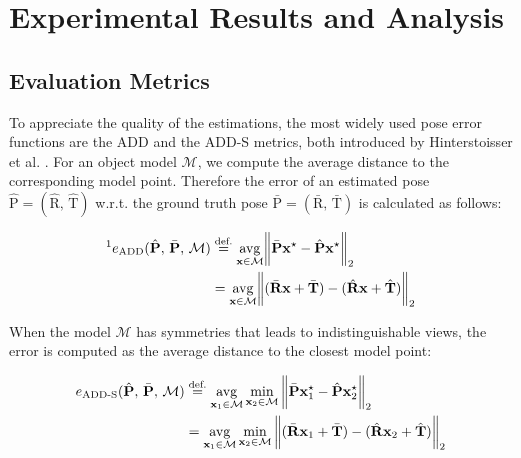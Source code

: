 
\chapter{Experimental Results and Analysis}\label{chapter:presentation_of_the_results}

\section{Evaluation Metrics}

To appreciate the quality of the estimations, the most widely used pose error functions are the \ac{ADD} and the \ac{ADD-S} metrics, both introduced by Hinterstoisser et al. \cite{10.1007/978-3-642-37331-2_42}. For an object model $\mathcal{M}$, we compute the average distance to the corresponding model point. Therefore the error of an estimated pose $\hat{\bm{\mathrm{P}}}=(\hat{\bm{\mathrm{R}}},\,\hat{\bm{\mathrm{T}}})$ w.r.t. the ground truth pose $\bar{\bm{\mathrm{P}}}=(\bar{\bm{\mathrm{R}}},\,\bar{\bm{\mathrm{T}}})$ is calculated as follows:

\begin{align}
	\textit{\footnotemark}e_\mathrm{ADD}(\hat{\bm{\mathrm{P}}},\,\bar{\bm{\mathrm{P}}},\,\mathcal{M})&\stackrel{\text{def.}}{=}\underset{\bm{\mathrm{x}}\in\mathcal{M}}{\mathrm{avg}}\norm\bigg{\bar{\bm{\mathrm{P}}}\bm{\mathrm{x}}^\star-\hat{\bm{\mathrm{P}}}\bm{\mathrm{x}}^\star}_2 \\
	&=\underset{\bm{\mathrm{x}}\in\mathcal{M}}{\mathrm{avg}}\norm\bigg{(\bar{\bm{\mathrm{R}}}\bm{\mathrm{x}}+\bar{\bm{\mathrm{T}}})-(\hat{\bm{\mathrm{R}}}\bm{\mathrm{x}}+\hat{\bm{\mathrm{T}}})}_2
\end{align}

\noindent When the model $\mathcal{M}$ has symmetries that leads to indistinguishable views, the error is computed as the average distance to the closest model point:
 
\begin{align}
	e_{\mathrm{ADD}\text{-}\mathrm{S}}(\hat{\bm{\mathrm{P}}},\,\bar{\bm{\mathrm{P}}},\,\mathcal{M})&\stackrel{\text{def.}}{=} \underset{\bm{\mathrm{x}}_1\in\mathcal{M}}{\mathrm{avg}}\min\limits_{\bm{\mathrm{x}}_2\in\mathcal{M}}\norm\bigg{\bar{\bm{\mathrm{P}}}\bm{\mathrm{x}}_1^\star-\hat{\bm{\mathrm{P}}}\bm{\mathrm{x}}_2^\star}_2 \\
	&=\underset{\bm{\mathrm{x}}_1\in\mathcal{M}}{\mathrm{avg}}\min\limits_{\bm{\mathrm{x}}_2\in\mathcal{M}}\norm\bigg{(\bar{\bm{\mathrm{R}}}\bm{\mathrm{x}}_1+\bar{\bm{\mathrm{T}}})-(\hat{\bm{\mathrm{R}}}\bm{\mathrm{x}}_2+\hat{\bm{\mathrm{T}}})}_2
\end{align}

